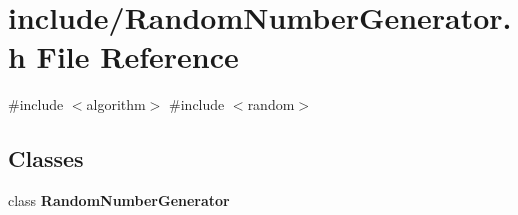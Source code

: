 \section{include/\+Random\+Number\+Generator.h File Reference}
\label{_random_number_generator_8h}
{\ttfamily \#include $<$algorithm$>$}\newline
{\ttfamily \#include $<$random$>$}\newline
\subsection*{Classes}
\begin{DoxyCompactItemize}
\item 
class \textbf{ Random\+Number\+Generator}
\end{DoxyCompactItemize}
